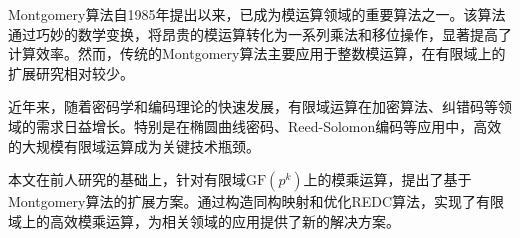 \begin{comment} %
	
\section*{引言}
\addcontentsline{toc}{section}{引言} %
Montgomery算法自1985年提出以来，已成为模运算领域的重要算法之一。该算法通过巧妙的数学变换，将昂贵的模运算转化为一系列乘法和移位操作，显著提高了计算效率。然而，传统的Montgomery算法主要应用于整数模运算，在有限域上的扩展研究相对较少。

近年来，随着密码学和编码理论的快速发展，有限域运算在加密算法、纠错码等领域的需求日益增长。特别是在椭圆曲线密码、Reed-Solomon编码等应用中，高效的大规模有限域运算成为关键技术瓶颈。

本文在前人研究的基础上，针对有限域$\mathrm{GF}(p^k)$上的模乘运算，提出了基于Montgomery算法的扩展方案。通过构造同构映射和优化REDC算法，实现了有限域上的高效模乘运算，为相关领域的应用提供了新的解决方案。

\end{comment}


\begin{introduction}
	Montgomery算法自1985年提出以来，已成为模运算领域的重要算法之一。该算法通过巧妙的数学变换，将昂贵的模运算转化为一系列乘法和移位操作，显著提高了计算效率。然而，传统的Montgomery算法主要应用于整数模运算，在有限域上的扩展研究相对较少。
	
	近年来，随着密码学和编码理论的快速发展，有限域运算在加密算法、纠错码等领域的需求日益增长。特别是在椭圆曲线密码、Reed-Solomon编码等应用中，高效的大规模有限域运算成为关键技术瓶颈。
	
	本文在前人研究的基础上，针对有限域$\mathrm{GF}(p^k)$上的模乘运算，提出了基于Montgomery算法的扩展方案。通过构造同构映射和优化REDC算法，实现了有限域上的高效模乘运算，为相关领域的应用提供了新的解决方案。
\end{introduction}
